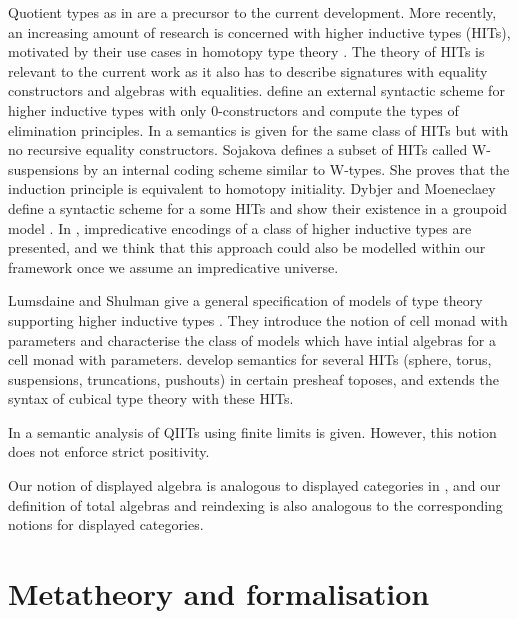 \documentclass[acmsmall,review,anonymous]{acmart}\settopmatter{printfolios=true,printccs=false,printacmref=false}
\begin{document}
Quotient types as in \cite{hofmann95extensional} are a precursor to
the current development. More recently, an increasing amount of
research is concerned with higher inductive types (HITs), motivated by
their use cases in homotopy type theory \cite{HoTTbook}. The theory of
HITs is relevant to the current work as it also has to describe
signatures with equality constructors and algebras with
equalities. \cite{niels} define an external syntactic scheme for
higher inductive types with only 0-constructors and compute the types
of elimination principles. In \cite{nielsmsc} a semantics is given for
the same class of HITs but with no recursive equality
constructors. Sojakova \cite{sojakova} defines a subset of HITs
called W-suspensions by an internal coding scheme similar to
W-types. She proves that the induction principle is equivalent to
homotopy initiality. Dybjer and Moeneclaey define a syntactic scheme
for a some HITs
and show their existence in a groupoid model
\cite{moeneclaey}. In \cite{AwodeyFS18}, impredicative encodings of a
class of higher inductive types are presented, and we think that this
approach could also be modelled within our framework once we assume an
impredicative universe.

Lumsdaine and Shulman give a general specification of
models of type theory supporting higher inductive types
\cite{lumsdaineShulman}. They introduce the notion of cell monad with
parameters and characterise the class of models which have intial
algebras for a cell monad with parameters. \cite{cubicalhits} develop
semantics for several HITs (sphere, torus, suspensions, truncations,
pushouts) in certain presheaf toposes, and extends the syntax of
cubical type theory \cite{ctt} with these HITs.

In \cite{altenkirch2018quotient} a
semantic analysis of QIITs using finite limits is given. However, this
notion does not enforce strict positivity.

Our notion of displayed algebra is analogous to displayed categories
in \cite{displayedCategories}, and our definition of total algebras
and reindexing is also analogous to the corresponding notions for
displayed categories.


\section{Metatheory and formalisation}
\label{sec:metatheory}
\end{document}
